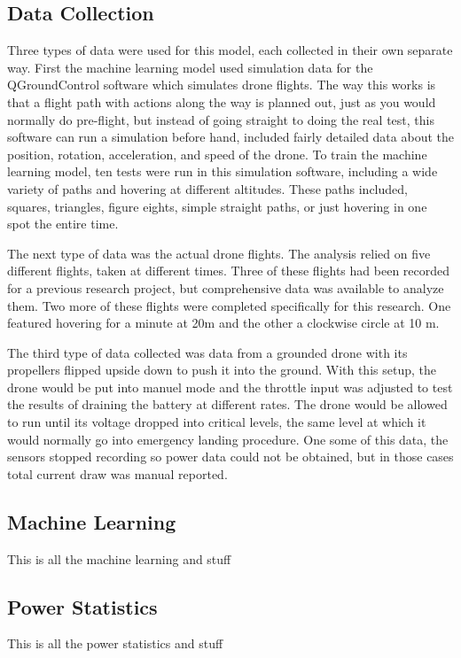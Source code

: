 \documentclass{article}
\begin{document}
\subsection{Data Collection}
Three types of data were used for this model, each collected in their own separate way. First the machine learning model used simulation data for the QGroundControl software which simulates drone flights. The way this works is that a flight path with actions along the way is planned out, just as you would normally do pre-flight, but instead of going straight to doing the real test, this software can run a simulation before hand, included fairly detailed data about the position, rotation, acceleration, and speed of the drone. To train the machine learning model, ten tests were run in this simulation software, including a wide variety of paths and hovering at different altitudes. These paths included, squares, triangles, figure eights, simple straight paths, or just hovering in one spot the entire time. \par

The next type of data was the actual drone flights. The analysis relied on five different flights, taken at different times. Three of these flights had been recorded for a previous research project, but comprehensive data was available to analyze them. Two more of these flights were completed specifically for this research. One featured hovering for a minute at 20m and the other a clockwise circle at 10 m.\par

The third type of data collected was data from a grounded drone with its propellers flipped upside  down to push it into the ground. With this setup, the drone would be put into manuel mode and the throttle input was adjusted to test the results of draining the battery at different rates. The drone would be allowed to run until its voltage dropped into critical levels, the same level at which it would normally go into emergency landing procedure. One some of this data, the sensors stopped recording so power data could not be obtained, but in those cases total current draw was manual reported.






\subsection{Machine Learning}
This is all the machine learning and stuff


\subsection{Power Statistics}
This is all the power statistics and stuff
\end{document}
